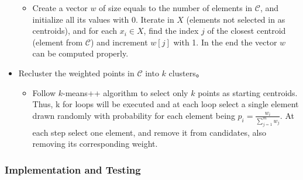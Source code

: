 \documentclass{article}
\begin{document}
\begin{itemize}
  \begin{itemize}
  \itemsep1pt\parskip0pt
  \item
    Create a vector $w$ of size equals to the number of elements in
    $\mathcal{C}$, and initialize all its values with 0. Iterate in $X$
    (elements not selected in as centroids), and for each $x_{i} \in X$,
    find the index $j$ of the closest centroid (element from
    $\mathcal{C}$) and increment $w[j]$ with 1. In the end the vector
    $w$ can be computed properly.
  \end{itemize}
\item
  Recluster the weighted points in $\mathcal{C}$ into $k$ clusters。

  \begin{itemize}
  \itemsep1pt\parskip0pt
  \item
    Follow $k$-means++ algorithm to select only $k$ points as starting
    centroids. Thus, k for loops will be executed and at each loop
    select a single element drawn randomly with probability for each
    element being $p_{i} = \frac{w_{i}}{\sum_{j = 1}^{m}w_{j}}$. At each
    step select one element, and remove it from candidates, also
    removing its corresponding weight.
  \end{itemize}
\end{itemize}

    \subsubsection{Implementation and
Testing}\label{implementation-and-testing}
\end{document}
